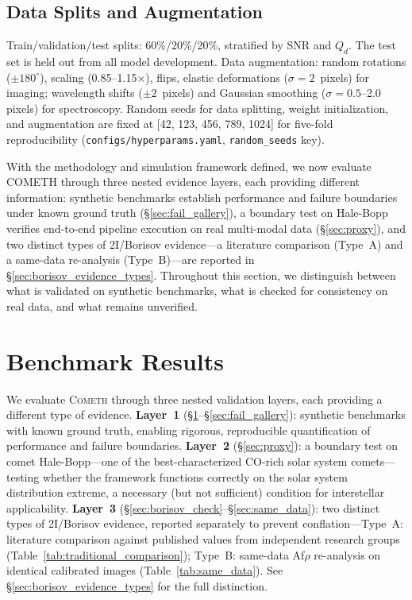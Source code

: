 \documentclass[usenatbib]{mnras}
\begin{document}
\subsection{Data Splits and Augmentation}

Train/validation/test splits: 60\%/20\%/20\%, stratified by SNR and $Q_d$. The test set is held out from all model development. Data augmentation: random rotations ($\pm 180^\circ$), scaling (0.85--1.15$\times$), flips, elastic deformations ($\sigma = 2$~pixels) for imaging; wavelength shifts ($\pm 2$~pixels) and Gaussian smoothing ($\sigma = 0.5$--2.0 pixels) for spectroscopy. Random seeds for data splitting, weight initialization, and augmentation are fixed at [42, 123, 456, 789, 1024] for five-fold reproducibility (\texttt{configs/hyperparams.yaml}, \texttt{random\_seeds} key).

With the methodology and simulation framework defined, we now evaluate COMETH through three nested evidence layers, each providing different information: synthetic benchmarks establish performance and failure boundaries under known ground truth (\S\ref{sec:fail_gallery}), a boundary test on Hale-Bopp verifies end-to-end pipeline execution on real multi-modal data (\S\ref{sec:proxy}), and two distinct types of 2I/Borisov evidence---a literature comparison (Type~A) and a same-data re-analysis (Type~B)---are reported in \S\ref{sec:borisov_evidence_types}. Throughout this section, we distinguish between what is validated on synthetic benchmarks, what is checked for consistency on real data, and what remains unverified.

\section{Benchmark Results}\label{sec:results}

We evaluate \textsc{Cometh} through three nested validation layers, each providing a different type of evidence. \textbf{Layer~1} (\S\ref{sec:results}--\S\ref{sec:fail_gallery}): synthetic benchmarks with known ground truth, enabling rigorous, reproducible quantification of performance and failure boundaries. \textbf{Layer~2} (\S\ref{sec:proxy}): a boundary test on comet Hale-Bopp---one of the best-characterized CO-rich solar system comets---testing whether the framework functions correctly on the solar system distribution extreme, a necessary (but not sufficient) condition for interstellar applicability. \textbf{Layer~3} (\S\ref{sec:borisov_check}--\S\ref{sec:same_data}): two distinct types of 2I/Borisov evidence, reported separately to prevent conflation---Type~A: literature comparison against published values from independent research groups (Table~\ref{tab:traditional_comparison}); Type~B: same-data Af$\rho$ re-analysis on identical calibrated images (Table~\ref{tab:same_data}). See \S\ref{sec:borisov_evidence_types} for the full distinction.
\end{document}
